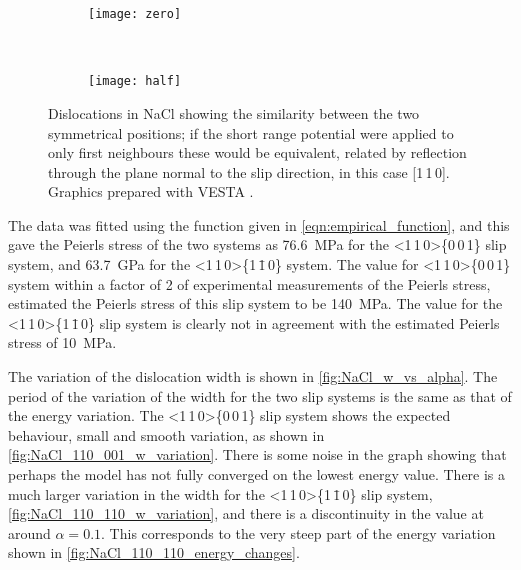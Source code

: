 \begin{figure}
\end{figure}



\begin{figure}
\centering
\begin{subfigure}{55mm}
\centering
\texttt{[image: zero]}
\caption{}
\end{subfigure}
~
\begin{subfigure}{55mm}
\centering
\texttt{[image: half]}
\caption{}
\end{subfigure}


\caption[The symmetrical positions of dislocations in NaCl.]{Dislocations in NaCl showing the similarity between the two symmetrical positions; if the short range potential were applied to only first neighbours these would be equivalent, related by reflection through the plane normal to the slip direction, in this case [1\,1\,0]. Graphics prepared with VESTA \cite{Momma2011}.\label{fig:NaCl_symmetry}}
\end{figure}


The data was fitted using the function given in \autoref{eqn:empirical_function}, and this gave the Peierls stress of the two systems as \SI{76.6}{\mega\pascal} for the <1\,1\,0>\{0\,0\,1\} slip system, and \SI{63.7}{\giga\pascal} for the <1\,1\,0>\{1\,\={1}\,0\} system. The value for <1\,1\,0>\{0\,0\,1\} system within a factor of 2 of experimental measurements of the Peierls stress, \citet{Haasen1985} estimated the Peierls stress of this slip system to be \SI{140}{\mega\pascal}. The value for the <1\,1\,0>\{1\,\={1}\,0\} slip system is clearly not in agreement with the estimated Peierls stress of \SI{10}{\mega\pascal}.



The variation of the dislocation width is shown in \autoref{fig:NaCl_w_vs_alpha}. The period of the variation of the width for the two slip systems is the same as that of the energy variation. The <1\,1\,0>\{0\,0\,1\} slip system shows the expected behaviour, small and smooth variation, as shown in \autoref{fig:NaCl_110_001_w_variation}. There is some noise in the graph showing that perhaps the model has not fully converged on the lowest energy value. There is a much larger variation in the width for the <1\,1\,0>\{1\,\={1}\,0\} slip system, \autoref{fig:NaCl_110_110_w_variation}, and there is a discontinuity in the value at around $\alpha=0.1$. This corresponds to the very steep part of the energy variation shown in \autoref{fig:NaCl_110_110_energy_changes}.


